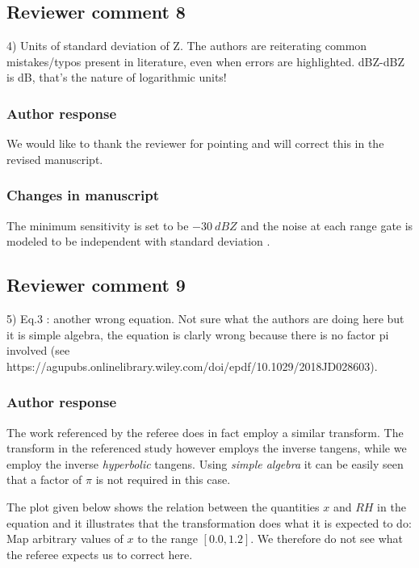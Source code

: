 \begin{description}
\subsection*{Reviewer comment 8}

4) Units of standard deviation of Z. The authors are reiterating common mistakes/typos present in literature,
even when errors are highlighted. dBZ-dBZ is dB, that's the nature of logarithmic units! 

\subsubsection*{Author response}

We would like to thank the reviewer for pointing and will correct this in the
revised manuscript.

\subsubsection*{Changes in manuscript}
\begin{change}[138]
 The minimum sensitivity is set to be $-30\ \unit{dBZ}$ and the noise at each
 range gate is modeled to be independent with standard deviation \DIFdelbegin
 \DIFdelend \DIFaddbegin
 \DIFaddend .
\end{change}

\subsection*{Reviewer comment 9}
5) Eq.3 : another wrong equation. Not sure what the authors are doing here but
it is simple algebra, the equation is clarly wrong because there is no factor pi
involved (see
https://agupubs.onlinelibrary.wiley.com/doi/epdf/10.1029/2018JD028603).

\subsubsection*{Author response}

The work referenced by the referee does in fact employ a similar transform. The
transform in the referenced study however employs the inverse tangens, while we
employ the inverse \textit{hyperbolic} tangens. Using \textit{simple algebra} it
can be easily seen that a factor of $\pi$ is not required in this case.

The plot given below shows the relation between the quantities $x$ and $RH$ in
the equation and it illustrates that the transformation does what it is expected
to do: Map arbitrary values of $x$ to the range $[0.0, 1.2]$. We therefore do
not see what the referee expects us to correct here.


\end{description}
